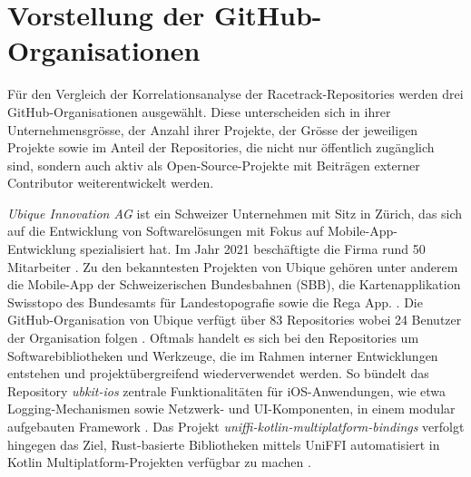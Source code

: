 \section{Vorstellung der GitHub-Organisationen}
\label{sec:VorstellungGithubOrgs}
Für den Vergleich der Korrelationsanalyse der Racetrack-Repositories werden drei GitHub-Organisationen ausgewählt. Diese unterscheiden sich in ihrer Unternehmensgrösse, der Anzahl ihrer Projekte, der Grösse der jeweiligen Projekte sowie im Anteil der Repositories, die nicht nur öffentlich zugänglich sind, sondern auch aktiv als Open-Source-Projekte mit Beiträgen externer Contributor weiterentwickelt werden.

\textit{Ubique Innovation AG} ist ein Schweizer Unternehmen mit Sitz in Zürich, das sich auf die Entwicklung von Softwarelösungen mit Fokus auf Mobile-App-Entwicklung spezialisiert hat. Im Jahr 2021 beschäftigte die Firma rund 50 Mitarbeiter \cite{noauthor_mathias_2021}. Zu den bekanntesten Projekten von Ubique gehören unter anderem die Mobile-App der Schweizerischen Bundesbahnen (SBB), die Kartenapplikation Swisstopo des Bundesamts für Landestopografie sowie die Rega App. \parencite{noauthor_apps_nodate}. Die GitHub-Organisation von Ubique verfügt über 83 Repositories wobei 24 Benutzer der Organisation folgen \parencite{noauthor_ubique_nodate}. Oftmals handelt es sich bei den Repositories um Softwarebibliotheken und Werkzeuge, die im Rahmen interner Entwicklungen entstehen und projektübergreifend wiederverwendet werden. So bündelt das Repository \textit{ubkit-ios} zentrale Funktionalitäten für iOS-Anwendungen, wie etwa Logging-Mechanismen sowie Netzwerk- und UI-Komponenten, in einem modular aufgebauten Framework \parencite{noauthor_ubiqueinnovationubkit-ios_2025}. Das Projekt \textit{uniffi-kotlin-multiplatform-bindings} verfolgt hingegen das Ziel, Rust-basierte Bibliotheken mittels UniFFI automatisiert in Kotlin Multiplatform-Projekten verfügbar zu machen \parencite{noauthor_ubiqueinnovationuniffi-kotlin-multiplatform-bindings_nodate}.


